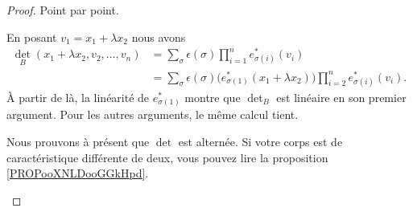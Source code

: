\begin{proof}
    Point par point.
    \begin{subproof}
    \item[\ref{ITEMooAHOHooDZgtSB}]
            En posant \( v_1=x_1+\lambda x_2\) nous avons
            \begin{subequations}
                \begin{align}
                    \det_B(x_1+\lambda x_2,v_2,\ldots, v_n)&=\sum_{\sigma}\epsilon(\sigma)\prod_{i=1}^ne^*_{\sigma(i)}(v_i)\\
                    &=\sum_{\sigma}\epsilon(\sigma)\Big( e^*_{\sigma(1)}(x_1+\lambda x_2) \Big)\prod_{i=2}^ne^*_{\sigma(i)}(v_i).
                \end{align}
            \end{subequations}
            À partir de là, la linéarité de \( e^*_{\sigma(1)}\) montre que \( \det_B\) est linéaire en son premier argument. Pour les autres arguments, le même calcul tient.

        \item[\ref{ITEMooTXXBooBmDtzd}]

            Nous prouvons à présent que \( \det\) est alternée. Si votre corps est de caractéristique différente de deux, vous pouvez lire la proposition \ref{PROPooXNLDooGGkHpd}.


\end{subproof}
\end{proof}
